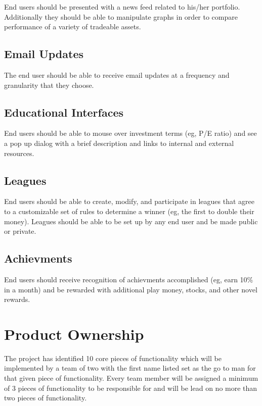 \documentclass[11pt,letterpaper,oneside]{memoir}
\begin{document}
End users should be presented with a news feed related to his/her portfolio.
Additionally they should be able to manipulate graphs in order to compare
performance of a variety of tradeable assets.

\section{Email Updates}

The end user should be able to receive email updates at a frequency and granularity that they choose.

\section{Educational Interfaces}

End users should be able to mouse over investment terms (eg, P/E ratio) and see a pop up
dialog with a brief description and links to internal and external resources.

\section{Leagues}

End users should be able to create, modify, and participate in leagues that agree to a customizable
set of rules to determine a winner (eg, the first to double their money).  Leagues should be able
to be set up by any end user and be made public or private.

\section{Achievments}

End users should receive recognition of achievments accomplished (eg, earn 10\% in a month) and
be rewarded with additional play money, stocks, and other novel rewards.

\chapter{Product Ownership}
The project has identified 10 core pieces of functionality which will be implemented by a team of two
with the first name listed set as the go to man for that given piece of functionality.  Every team
member will be assigned a minimum of 3 pieces of functionality to be responsible for and will be
lead on no more than two pieces of functionality.
\end{document}

